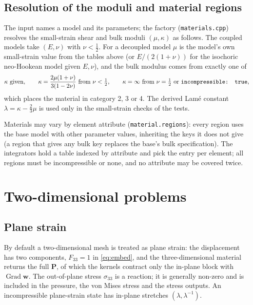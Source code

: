 \documentclass[11pt]{article}
\newcommand{\Grad}{\operatorname{Grad}}
\newcommand{\bw}{\bm{w}}
\newcommand{\bP}{\bm{P}}
\DeclareRobustCommand{\code}[1]{{\def\_{\textunderscore\allowbreak}\texttt{#1}}}
\DeclareRobustCommand{\file}[1]{{\def\_{\textunderscore\allowbreak}\texttt{#1}}}
\begin{document}
\subsection{Resolution of the moduli and material regions}
\label{sec:moduli}

The input names a model and its parameters; the factory
(\file{materials.cpp}) resolves the small-strain shear and bulk moduli
$(\mu, \kappa)$ as follows.  The coupled models take $(E, \nu)$ with
$\nu < \tfrac12$.  For a decoupled model $\mu$ is the model's own
small-strain value from the tables above (or $E/(2(1+\nu))$ for the
isochoric neo-Hookean model given $E, \nu$), and the bulk modulus comes
from exactly one of
\begin{equation}
  \kappa \ \text{given}, \qquad
  \kappa = \frac{2\mu(1+\nu)}{3(1 - 2\nu)}\ \text{from } \nu < \tfrac12, \qquad
  \kappa = \infty \ \text{from } \nu = \tfrac12 \text{ or \code{incompressible: true}},
\end{equation}
which places the material in category 2, 3 or 4.  The derived Lam\'e
constant $\lambda = \kappa - \tfrac23\mu$ is used only in the small-strain
checks of the tests.

Materials may vary by element attribute (\code{material.regions}): every
region uses the base model with other parameter values, inheriting the
keys it does not give (a region that gives any bulk key replaces the
base's bulk specification).  The integrators hold a table indexed by
attribute and pick the entry per element; all regions must be
incompressible or none, and no attribute may be covered twice.

\section{Two-dimensional problems}
\label{sec:planestress}

\subsection{Plane strain}

By default a two-dimensional mesh is treated as plane strain: the
displacement has two components, $F_{33} = 1$ in \eqref{eq:embed}, and the
three-dimensional material returns the full $\bP$, of which the kernels
contract only the in-plane block with $\Grad\bw$.  The out-of-plane stress
$\sigma_{33}$ is a reaction; it is generally non-zero and is included in
the pressure, the von Mises stress and the stress outputs.  An
incompressible plane-strain state has in-plane stretches
$(\lambda, \lambda^{-1})$.
\end{document}
